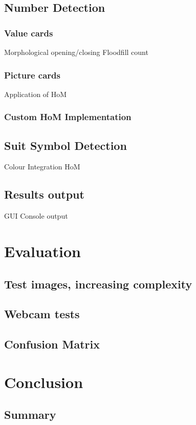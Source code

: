 \documentclass[a4paper,12pt,notitlepage]{article}
\begin{document}
	\subsection{Number Detection}
		\subsubsection{Value cards}
			Morphological opening/closing
			Floodfill count
		\subsubsection{Picture cards}
			Application of HoM
		\subsubsection{Custom HoM Implementation}
	\subsection{Suit Symbol Detection}
		Colour Integration
		HoM
	\subsection{Results output}
		GUI
		Console output
\pagebreak
\section{Evaluation}
	\subsection{Test images, increasing complexity}
	\subsection{Webcam tests}
	\subsection{Confusion Matrix}
\pagebreak
\section{Conclusion}
	\subsection{Summary}
\end{document}
